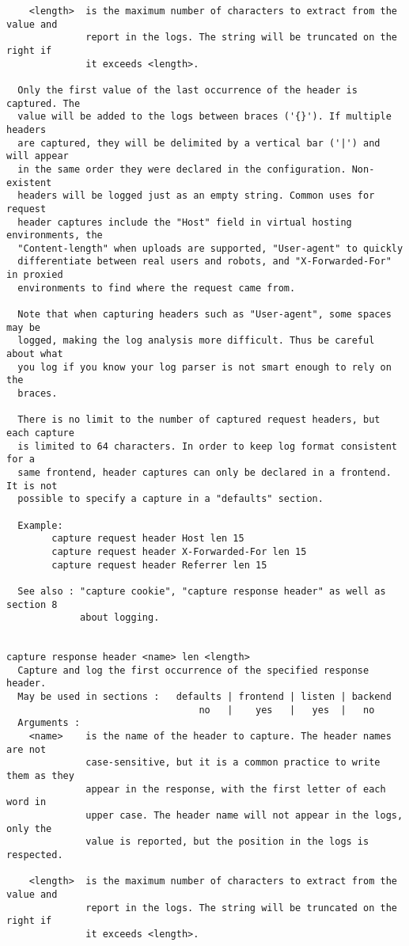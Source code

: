 \begin{verbatim}
    <length>  is the maximum number of characters to extract from the value and
              report in the logs. The string will be truncated on the right if
              it exceeds <length>.

  Only the first value of the last occurrence of the header is captured. The
  value will be added to the logs between braces ('{}'). If multiple headers
  are captured, they will be delimited by a vertical bar ('|') and will appear
  in the same order they were declared in the configuration. Non-existent
  headers will be logged just as an empty string. Common uses for request
  header captures include the "Host" field in virtual hosting environments, the
  "Content-length" when uploads are supported, "User-agent" to quickly
  differentiate between real users and robots, and "X-Forwarded-For" in proxied
  environments to find where the request came from.

  Note that when capturing headers such as "User-agent", some spaces may be
  logged, making the log analysis more difficult. Thus be careful about what
  you log if you know your log parser is not smart enough to rely on the
  braces.

  There is no limit to the number of captured request headers, but each capture
  is limited to 64 characters. In order to keep log format consistent for a
  same frontend, header captures can only be declared in a frontend. It is not
  possible to specify a capture in a "defaults" section.

  Example:
        capture request header Host len 15
        capture request header X-Forwarded-For len 15
        capture request header Referrer len 15

  See also : "capture cookie", "capture response header" as well as section 8
             about logging.


capture response header <name> len <length>
  Capture and log the first occurrence of the specified response header.
  May be used in sections :   defaults | frontend | listen | backend
                                  no   |    yes   |   yes  |   no
  Arguments :
    <name>    is the name of the header to capture. The header names are not
              case-sensitive, but it is a common practice to write them as they
              appear in the response, with the first letter of each word in
              upper case. The header name will not appear in the logs, only the
              value is reported, but the position in the logs is respected.

    <length>  is the maximum number of characters to extract from the value and
              report in the logs. The string will be truncated on the right if
              it exceeds <length>.


\end{verbatim}
